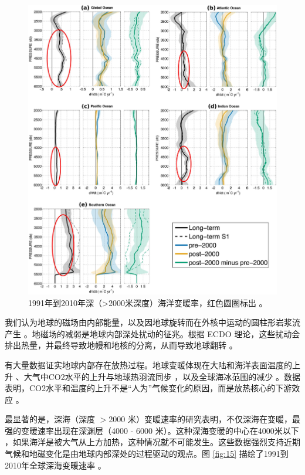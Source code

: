 \documentclass[10pt,twocolumn,letterpaper]{article}
\begin{document}
\begin{figure}[t]
\begin{center}
   \includegraphics[width=1\linewidth]{ocean-highlight.jpg}
\end{center}
   \caption{1991年到2010年深（>2000米深度）海洋变暖率，红色圆圈标出 \cite{132}。}
\label{fig:15}
\label{fig:onecol}
\end{figure}

我们认为地球的磁场由内部能量，以及因地球旋转而在外核中运动的圆柱形岩浆流产生 \cite{123}。地磁场的减弱是地球内部深处扰动的征兆。根据 ECDO 理论，这些扰动会排出热量，并最终导致地幔和地核的分离，从而导致地球翻转 \cite{1}。

有大量数据证实地球内部存在放热过程。地球变暖体现在大陆和海洋表面温度的上升 \cite{127,128}、大气中CO2水平的上升与地球热羽流同步 \cite{129,130}，以及全球海冰范围的减少 \cite{131}。数据表明，CO2水平和温度的上升不是“人为”气候变化的原因，而是放热核心的下游效应 \cite{129}。

最显著的是，深海（深度 $>$2000 米）变暖速率的研究表明，不仅深海在变暖，最强的变暖速率出现在深渊层（4000 - 6000 米）。这种深海变暖的中心在4000米以下 \cite{132,129}，如果海洋是被大气从上方加热，这种情况就不可能发生。这些数据强烈支持近期气候和地磁变化是由地球内部深处的过程驱动的观点。图 \ref{fig:15} 描绘了1991到2010年全球深海变暖速率 \cite{132}。
\end{document}
